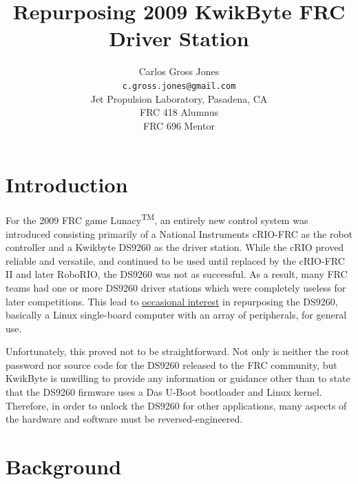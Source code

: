\documentclass[]{article}
\title{Repurposing 2009 KwikByte FRC Driver Station}
\author{Carlos Gross Jones\\\texttt{c.gross.jones@gmail.com}\\Jet Propulsion Laboratory, Pasadena, CA\\FRC 418 Alumnus\\FRC 696 Mentor}
\begin{document}
\maketitle

\section{Introduction}
\par For the 2009 FRC game Lunacy\textsuperscript{TM}, an entirely new control system was introduced consisting primarily of a National Instruments cRIO-FRC as the robot controller and a Kwikbyte DS9260 as the driver station. While the cRIO proved reliable and versatile, and continued to be used until replaced by the cRIO-FRC II and later RoboRIO, the DS9260 was not as successful. As a result, many FRC teams had one or more DS9260 driver stations which were completely useless for later competitions. This lead to \href{https://www.chiefdelphi.com/forums/showthread.php?t=102417}{occasional interest} in repurposing the DS9260, basically a Linux single-board computer with an array of peripherals, for general use. 
\par Unfortunately, this proved not to be straightforward. Not only is neither the root password nor source code for the DS9260 released to the FRC community, but KwikByte is unwilling to provide any information or guidance other than to state that the DS9260 firmware uses a Das U-Boot bootloader and Linux kernel. Therefore, in order to unlock the DS9260 for other applications, many aspects of the hardware and software must be reversed-engineered. 
\section{Background}
\end{document}

